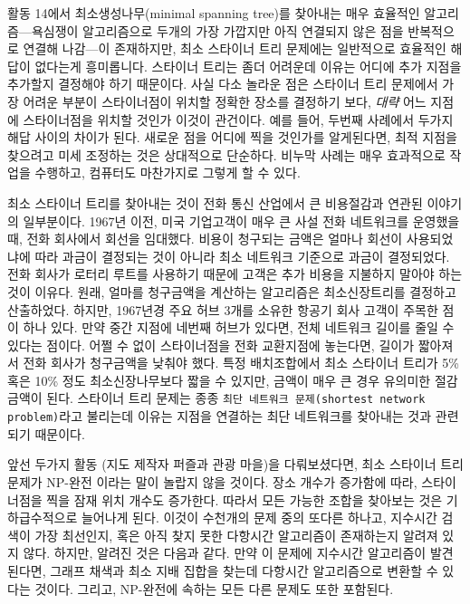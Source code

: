 \documentclass[]{article}
\begin{document}
활동 14에서 최소생성나무(minimal spanning tree)를 찾아내는 매우 효율적인
알고리즘---욕심쟁이 알고리즘으로 두개의 가장 가깝지만 아직 연결되지 않은
점을 반복적으로 연결해 나감---이 존재하지만, 최소 스타이너 트리 문제에는
일반적으로 효율적인 해답이 없다는게 흥미롭니다. 스타이너 트리는 좀더
어려운데 이유는 어디에 추가 지점을 추가할지 결정해야 하기 때문이다. 사실
다소 놀라운 점은 스타이너 트리 문제에서 가장 어려운 부분이 스타이너점이
위치할 정확한 장소를 결정하기 보다, \emph{대략} 어느 지점에 스타이너점을
위치할 것인가 이것이 관건이다. 예를 들어, 두번째 사례에서 두가지 해답
사이의 차이가 된다. 새로운 점을 어디에 찍을 것인가를 알게된다면, 최적
지점을 찾으려고 미세 조정하는 것은 상대적으로 단순하다. 비누막 사례는
매우 효과적으로 작업을 수행하고, 컴퓨터도 마찬가지로 그렇게 할 수 있다.

최소 스타이너 트리를 찾아내는 것이 전화 통신 산업에서 큰 비용절감과
연관된 이야기의 일부분이다. 1967년 이전, 미국 기업고객이 매우 큰 사설
전화 네트워크를 운영했을 때, 전화 회사에서 회선을 임대했다. 비용이
청구되는 금액은 얼마나 회선이 사용되었냐에 따라 과금이 결정되는 것이
아니라 최소 네트워크 기준으로 과금이 결정되었다. 전화 회사가 로터리
루트를 사용하기 때문에 고객은 추가 비용을 지불하지 말아야 하는 것이
이유다. 원래, 얼마를 청구금액을 계산하는 알고리즘은 최소신장트리를
결정하고 산출하었다. 하지만, 1967년경 주요 허브 3개를 소유한 항공기 회사
고객이 주목한 점이 하나 있다. 만약 중간 지점에 네번째 허브가 있다면,
전체 네트워크 길이를 줄일 수 있다는 점이다. 어쩔 수 없이 스타이너점을
전화 교환지점에 놓는다면, 길이가 짧아져서 전화 회사가 청구금액을 낮춰야
했다. 특정 배치조합에서 최소 스타이너 트리가 5\% 혹은 10\% 정도
최소신장나무보다 짧을 수 있지만, 금액이 매우 큰 경우 유의미한 절감금액이
된다. 스타이너 트리 문제는 종종
\texttt{최단 네트워크 문제(shortest network problem)}라고 불리는데
이유는 지점을 연결하는 최단 네트워크를 찾아내는 것과 관련되기 때문이다.

앞선 두가지 활동 (지도 제작자 퍼즐과 관광 마을)을 다뤄보셨다면, 최소
스타이너 트리 문제가 NP-완전 이라는 말이 놀랍지 않을 것이다. 장소 개수가
증가함에 따라, 스타이너점을 찍을 잠재 위치 개수도 증가한다. 따라서 모든
가능한 조합을 찾아보는 것은 기하급수적으로 늘어나게 된다. 이것이
수천개의 문제 중의 또다른 하나고, 지수시간 검색이 가장 최선인지, 혹은
아직 찾지 못한 다항시간 알고리즘이 존재하는지 알려져 있지 않다. 하지만,
알려진 것은 다음과 같다. 만약 이 문제에 지수시간 알고리즘이 발견된다면,
그래프 채색과 최소 지배 집합을 찾는데 다항시간 알고리즘으로 변환할 수
있다는 것이다. 그리고, NP-완전에 속하는 모든 다른 문제도 또한 포함된다.
\end{document}
